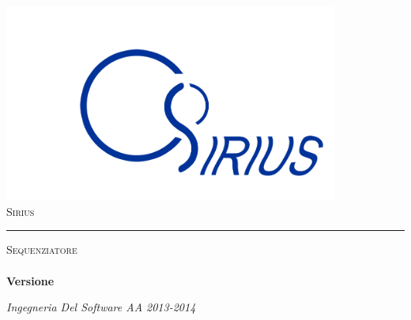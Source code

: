 \begin{titlepage}
 \begin{center}
     \includegraphics[width=11cm]{../modello/img/sirius11.png}\\
     \vspace{1em}
     {\LARGE \textsc{Sirius}}\\
     \vspace{2em} \hrule \vspace{2em}
     {\Large \textsc{Sequenziatore}}\\
     \vspace{8em}
     {\LARGE \LARGE \LARGE \textbf{\doctitle}}\\
     \vspace{2em}
     {\LARGE \LARGE \LARGE \textbf{Versione \lastversion }}\\
     \vspace{4em}
 \end{center}


\vskip 1.8cm
\begin{center}
\textit{Ingegneria Del Software AA 2013-2014}
\end{center}

\end{titlepage}

